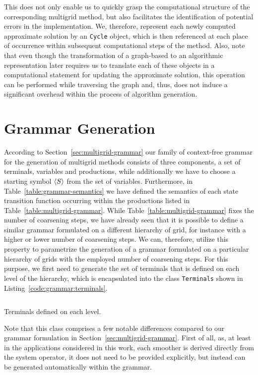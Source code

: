 This does not only enable us to quickly grasp the computational structure of the corresponding multigrid method, but also facilitates the identification of potential errors in the implementation.
We, therefore, represent each newly computed approximate solution by an \texttt{Cycle} object, which is then referenced at each place of occurrence within subsequent computational steps of the method.
Also, note that even though the transformation of a graph-based to an algorithmic representation later requires us to translate each of these objects in a computational statement for updating the approximate solution, this operation can be performed while traversing the graph and, thus, does not induce a significant overhead within the process of algorithm generation. 
\section{Grammar Generation}
According to Section~\ref{sec:multigrid-grammar} our family of context-free grammar for the generation of multigrid methods consists of three components, a set of terminals, variables and productions, while additionally we have to choose a starting symbol $\langle S \rangle$ from the set of variables.
Furthermore, in Table~\ref{table:grammar-semantics} we have defined the semantics of each state transition function occurring within the productions listed in Table~\ref{table:multigrid-grammar}.
While Table~\ref{table:multigrid-grammar} fixes the number of coarsening steps, we have already seen that it is possible to define a similar grammar formulated on a different hierarchy of grid, for instance with a higher or lower number of coarsening steps.
We can, therefore, utilize this property to parametrize the generation of a grammar formulated on a particular hierarchy of grids with the employed number of coarsening steps.
For this purpose, we first need to generate the set of terminals that is defined on each level of the hierarchy, which is encapsulated into the class \texttt{Terminals} shown in Listing~\ref{code:grammar:terminals}.
\begin{listing}
	\inputminted{python}{evostencils/grammar/terminals.py}
	\caption{Terminals defined on each level.}
	\label{code:grammar:terminals}
\end{listing}
Note that this class comprises a few notable differences compared to our grammar formulation in Section~\ref{sec:multigrid-grammar}.
First of all, as, at least in the applications considered in this work, each smoother is derived directly from the system operator, it does not need to be provided explicitly, but instead can be generated automatically within the grammar.
